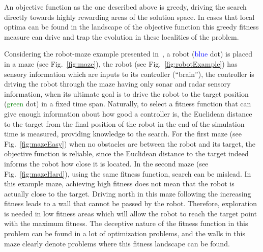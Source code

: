 An objective function as the one described above is greedy, driving the search directly towards highly rewarding areas of the solution space. In cases that local optima can be found in the landscape of the objective function this greedy fitness measure can drive and trap the evolution in these localities of the problem.

Considering the robot-maze example presented in~\citep{lehman2011abandoning,lehman2010revising}, a robot (\textcolor{Blue}{blue} dot) is placed in a maze (see Fig.~\ref{fig:maze}), the robot (see Fig.~\ref{fig:robotExample}) has sensory information which are inputs to its controller (``brain''), the controller is driving the robot through the maze having only sonar and radar sensory information, when its ultimate goal is to drive the robot to the target position (\textcolor{Green}{green} dot) in a fixed time span. Naturally, to select a fitness function that can give enough information about how good a controller is, the Euclidean distance to the target from the final position of the robot in the end of the simulation time is measured, providing knowledge to the search. For the first maze (see Fig.~\ref{fig:mazeEasy}) when no obstacles are between the robot and its target, the objective function is reliable, since the Euclidean distance to the target indeed informs the robot how close it is located. In the second maze (see Fig.~\ref{fig:mazeHard}), using the same fitness function, search can be mislead. In this example maze, achieving high fitness does not mean that the robot is actually close to the target. Driving north in this maze following the increasing fitness leads to a wall that cannot be passed by the robot. Therefore, exploration is needed in low fitness areas which will allow the robot to reach the target point with the maximum fitness. The deceptive nature of the fitness function in this problem can be found in a lot of optimization problems, and the walls in this maze clearly denote problems where this fitness landscape can be found. 

